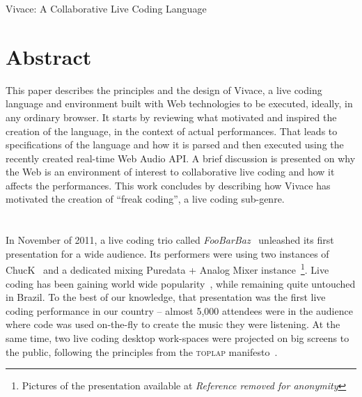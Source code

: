 \documentclass[letterpaper, 12pt]{article}
\begin{document}
{\cmjTitle Vivace: A Collaborative Live Coding Language}

\vspace*{24pt}

\section*{Abstract}

This paper describes the principles and the design of Vivace, a live
coding language and environment built with Web technologies to be
executed, ideally, in any ordinary browser. It starts by reviewing
what motivated and inspired the creation of the language, in the
context of actual performances. That leads to specifications of the
language and how it is parsed and then executed using the recently
created real-time Web Audio API. A brief discussion is presented on
why the Web is an environment of interest to collaborative live coding
and how it affects the performances. This work concludes by describing
how Vivace has motivated the creation of ``freak coding'', a live
coding sub-genre.

\section*{} %

In November of 2011, a live coding trio called
\textit{FooBarBaz}~\citep{foobarbaz} unleashed its first presentation
for a wide audience. Its performers were using two instances of
ChucK~\citep{wang2003chuck} and a dedicated mixing Puredata + Analog
Mixer instance~\footnote{Pictures of the presentation available at
  \textit{Reference removed for anonymity}}. Live
coding has been gaining world wide popularity~\citep{nilson2007live,
  collins2003live, brown2007a, collins2011live}, while remaining quite
untouched in Brazil. To the best of our knowledge, that presentation
was the first live coding performance in our country -- almost 5,000
attendees were in the audience where code was used on-the-fly to
create the music they were listening. At the same time, two live
coding desktop work-spaces were projected on big screens to the
public, following the principles from the \textsc{toplap}
manifesto~\citep{ward2004live}.
\end{document}
